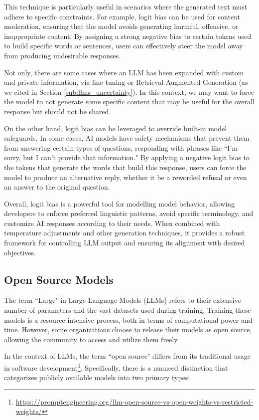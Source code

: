 This technique is particularly useful in scenarios where the generated text must
adhere to specific constraints. For example, logit bias can be used for content moderation,
ensuring that the model avoids generating harmful, offensive, or inappropriate
content. By assigning a strong negative bias to certain tokens used to build specific
words or sentences, users can effectively steer the model away from producing
undesirable responses.

Not only, there are some cases where an LLM has been expanded with custom and private
information, via fine-tuning or Retrieval Augmented Generation (as we cited in Section
\ref{sub:llms_uncertainty}). In this context, we may want to force the model to
not generate some specific content that may be useful for the overall response
but should not be shared.

On the other hand, logit bias can be leveraged to override built-in model safeguards.
In some cases, AI models have safety mechanisms that prevent them from answering
certain types of questions, responding with phrases like ``I'm sorry, but I can't
provide that information." By applying a negative logit bias to the tokens that generate
the words that build this response, users can force the model to produce an
alternative reply, whether it be a reworded refusal or even an answer to the original
question.

Overall, logit bias is a powerful tool for modelling model behavior, allowing developers
to enforce preferred linguistic patterns, avoid specific terminology, and customize
AI responses according to their needs. When combined with temperature
adjustments and other generation techniques, it provides a robust framework for controlling
LLM output and ensuring its alignment with desired objectives.

\subsection{Open Source Models}

The term ``Large" in Large Language Models (LLMs) refers to their extensive number
of parameters and the vast datasets used during training. Training these models
is a resource-intensive process, both in terms of computational power and time.
However, some organizations choose to release their models as open source,
allowing the community to access and utilize them freely.

In the context of LLMs, the term ``open source" differs from its traditional
usage in software development\footnote{\url{https://promptengineering.org/llm-open-source-vs-open-weights-vs-restricted-weights/}}.
Specifically, there is a nuanced distinction that categorizes publicly available
models into two primary types:

